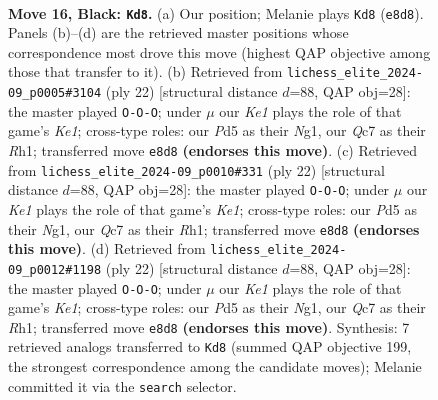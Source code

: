 \documentclass[11pt]{article}
\begin{document}
\clearpage

\begin{figure}[p]\centering
\begin{subfigure}{0.46\textwidth}\centering
\resizebox{\linewidth}{!}{%
\newchessgame
\chessboard[
  setfen={r1b1k2r/ppq3pp/2pb4/3p1p2/3P4/1Q2PN2/PP3PPP/1RB1K2R b K - 3 16},
  showmover=false,
  pgfstyle=straightmove, color=movearrow, markmove={e8-d8}
]}
\caption{}
\end{subfigure}\hfill
\begin{subfigure}{0.46\textwidth}\centering
\resizebox{\linewidth}{!}{%
\newchessgame
\chessboard[
  setfen={r1b1k2r/pp3ppp/n1pBpnq1/8/2P5/5B2/PP1Q1P1P/R3K1NR w KQkq - 4 12},
  showmover=false,
  pgfstyle=straightmove, color=movearrow, markmove={e1-c1}
]}
\caption{}
\end{subfigure}
\\[4pt]
\begin{subfigure}{0.46\textwidth}\centering
\resizebox{\linewidth}{!}{%
\newchessgame
\chessboard[
  setfen={r1b1k2r/pp3ppp/n1pBpnq1/8/2P5/5B2/PP1Q1P1P/R3K1NR w KQkq - 4 12},
  showmover=false,
  pgfstyle=straightmove, color=movearrow, markmove={e1-c1}
]}
\caption{}
\end{subfigure}\hfill
\begin{subfigure}{0.46\textwidth}\centering
\resizebox{\linewidth}{!}{%
\newchessgame
\chessboard[
  setfen={r1b1k2r/pp3ppp/n1pBpnq1/8/2P5/5B2/PP1Q1P1P/R3K1NR w KQkq - 4 12},
  showmover=false,
  pgfstyle=straightmove, color=movearrow, markmove={e1-c1}
]}
\caption{}
\end{subfigure}
\caption{\textbf{Move 16, Black: \texttt{Kd8}.} (a) Our position; Melanie plays \texttt{Kd8} (\texttt{e8d8}). Panels (b)--(d) are the retrieved master positions whose correspondence most drove this move (highest QAP objective among those that transfer to it). (b) Retrieved from \texttt{lichess\_elite\_2024-09\_p0005\#3104} (ply 22) [structural distance $d$=88, QAP obj=28]: the master played \texttt{O-O-O}; under $\mu$ our \emph{Ke1} plays the role of that game's \emph{Ke1}; cross-type roles: our \emph{P}d5 as their \emph{N}g1, our \emph{Q}c7 as their \emph{R}h1; transferred move \texttt{e8d8} \textbf{(endorses this move)}. (c) Retrieved from \texttt{lichess\_elite\_2024-09\_p0010\#331} (ply 22) [structural distance $d$=88, QAP obj=28]: the master played \texttt{O-O-O}; under $\mu$ our \emph{Ke1} plays the role of that game's \emph{Ke1}; cross-type roles: our \emph{P}d5 as their \emph{N}g1, our \emph{Q}c7 as their \emph{R}h1; transferred move \texttt{e8d8} \textbf{(endorses this move)}. (d) Retrieved from \texttt{lichess\_elite\_2024-09\_p0012\#1198} (ply 22) [structural distance $d$=88, QAP obj=28]: the master played \texttt{O-O-O}; under $\mu$ our \emph{Ke1} plays the role of that game's \emph{Ke1}; cross-type roles: our \emph{P}d5 as their \emph{N}g1, our \emph{Q}c7 as their \emph{R}h1; transferred move \texttt{e8d8} \textbf{(endorses this move)}. Synthesis: 7 retrieved analogs transferred to \texttt{Kd8} (summed QAP objective 199, the strongest correspondence among the candidate moves); Melanie committed it via the \texttt{search} selector.}
\label{fig:thought-m31}
\end{figure}
\end{document}
